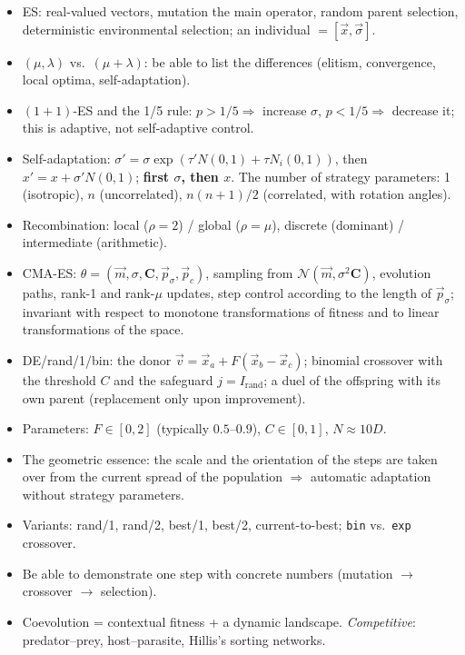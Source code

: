 \documentclass[11pt,a4paper]{article}
\theoremstyle{definition}
\begin{document}
\begin{itemize}
\item ES: real-valued vectors, mutation the main operator, random parent
  selection, deterministic environmental selection; an individual
  $= [\vec x, \vec\sigma]$.
\item $(\mu,\lambda)$ vs.\ $(\mu+\lambda)$: be able to list the differences
  (elitism, convergence, local optima, self-adaptation).
\item $(1+1)$-ES and the 1/5 rule: $p > 1/5 \Rightarrow$ increase $\sigma$,
  $p < 1/5 \Rightarrow$ decrease it; this is adaptive, not self-adaptive
  control.
\item Self-adaptation: $\sigma' = \sigma \exp(\tau'N(0,1) + \tau N_i(0,1))$, then
  $x' = x + \sigma' N(0,1)$; \textbf{first $\sigma$, then $x$}.
  The number of strategy parameters: 1 (isotropic), $n$ (uncorrelated),
  $n(n+1)/2$ (correlated, with rotation angles).
\item Recombination: local ($\rho=2$) / global ($\rho=\mu$),
  discrete (dominant) / intermediate (arithmetic).
\item CMA-ES: $\theta = (\vec m,\sigma,\mathbf C,\vec p_\sigma,\vec p_c)$,
  sampling from $\mathcal N(\vec m, \sigma^2\mathbf C)$, evolution paths,
  rank-1 and rank-$\mu$ updates, step control according to the length of
  $\vec p_\sigma$; invariant with respect to monotone transformations of fitness
  and to linear transformations of the space.
\item DE/rand/1/bin: the donor $\vec v = \vec x_a + F(\vec x_b - \vec x_c)$;
  binomial crossover with the threshold $C$ and the safeguard
  $j = I_{\mathrm{rand}}$; a duel of the offspring with its own parent
  (replacement only upon improvement).
\item Parameters: $F \in [0,2]$ (typically $0.5$--$0.9$), $C \in [0,1]$,
  $N \approx 10D$.
\item The geometric essence: the scale and the orientation of the steps are
  taken over from the current spread of the population $\Rightarrow$ automatic
  adaptation without strategy parameters.
\item Variants: rand/1, rand/2, best/1, best/2, current-to-best;
  \texttt{bin} vs.\ \texttt{exp} crossover.
\item Be able to demonstrate one step with concrete numbers (mutation $\to$
  crossover $\to$ selection).
\item Coevolution = contextual fitness + a dynamic landscape.
  \emph{Competitive}: predator--prey, host--parasite, Hillis's sorting networks.

\end{itemize}
\end{document}
